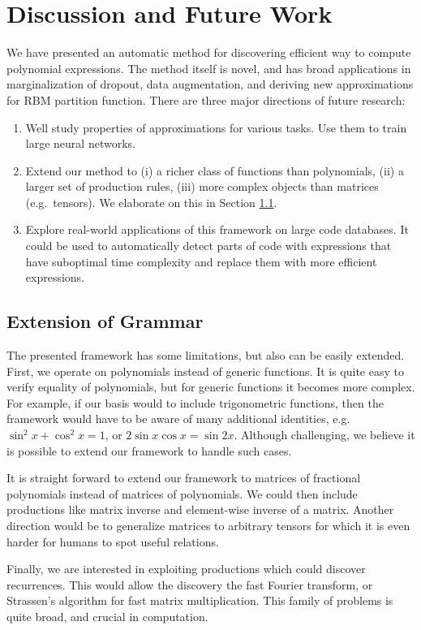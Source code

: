 \section{Discussion and Future Work}

We have presented an automatic method for discovering efficient way to
compute polynomial expressions. The method itself is novel, and
has broad applications in marginalization of dropout, data augmentation, and
deriving new approximations for RBM partition function. There are three
major directions of future research: 

\begin{enumerate}
  \item Well study properties of approximations for various tasks. Use them to
        train large neural networks.
  \item Extend our method to (i) a richer class of functions
    than polynomials, (ii) a larger set of production rules, (iii) more complex
    objects than matrices (e.g.~tensors). We elaborate on this in
    Section \ref{sec:extend}.
\item Explore real-world applications of this framework on large code databases. 
  It could be used to automatically detect parts of code with expressions that have suboptimal 
  time complexity and replace them with more efficient expressions.
\end{enumerate}


\subsection{Extension of Grammar}
\label{sec:extend}
The presented framework has some limitations, but also can be easily extended. First,
we operate on polynomials instead of generic functions. 
It is quite easy to verify equality of polynomials, but for generic functions it becomes more complex.
For example, if our basis would to include trigonometric functions, then the
framework would have to be aware of many additional identities,
e.g. $\sin^2{x} + \cos^2{x} = 1$, or $2\sin x \cos x = \sin
2x$. Although challenging, we believe it is possible to extend our
framework to handle such cases. 

It is straight forward to extend our framework to matrices of fractional
polynomials instead of matrices of polynomials.  We could
then include productions like matrix inverse and element-wise inverse of
a matrix.  Another direction would be to generalize matrices to arbitrary tensors
for which it is even harder for humans to spot useful relations.

Finally, we are interested in exploiting productions which could discover 
recurrences. This would allow the discovery the fast Fourier transform, or
Strassen's algorithm for fast matrix multiplication. This family of problems is quite broad,
and crucial in computation.


